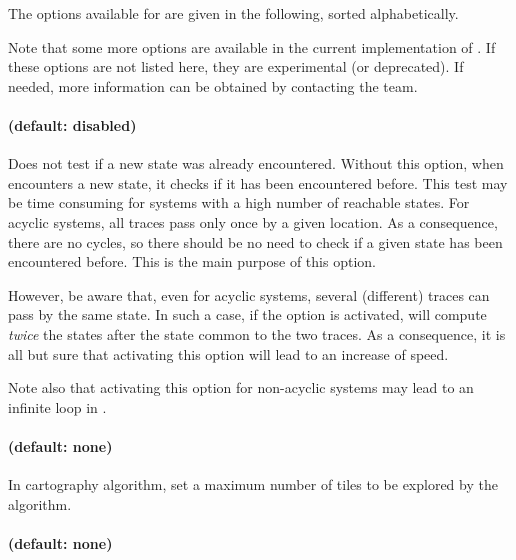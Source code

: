 The options available for \imitator{} are given in the following, sorted alphabetically.

Note that some more options are available in the current implementation of \imitator{}.
If these options are not listed here, they are experimental (or deprecated).
If needed, more information can be obtained by contacting the \imitator{} team.



\paragraph{ (default: disabled)}
Does not test if a new state was already encountered.
Without this option, when \imitator{} encounters a new state, it checks if it has been encountered before.
This test may be time consuming for systems with a high number of reachable states.
For acyclic systems, all traces pass only once by a given location.
As a consequence, there are no cycles, so there should be no need to check if a given state has been encountered before.
This is the main purpose of this option.

However, be aware that, even for acyclic systems, several (different) traces can pass by the same state.
In such a case, if the  option is activated, \imitator{} will compute \emph{twice} the states after the state common to the two traces.
As a consequence, it is all but sure that activating this option will lead to an increase of speed.

Note also that activating this option for non-acyclic systems may lead to an infinite loop in \imitator{}.


\paragraph{ (default: none)}

In cartography algorithm, set a maximum number of tiles to be explored by the algorithm.


\paragraph{ (default: none)}

